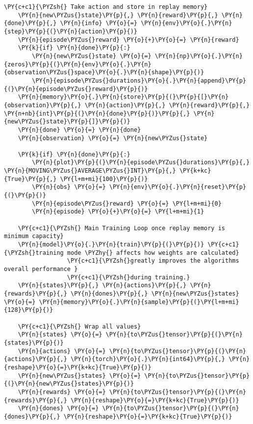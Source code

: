 \begin{tcolorbox}[breakable, size=fbox, boxrule=1pt, pad at break*=1mm,colback=cellbackground, colframe=cellborder]
\begin{Verbatim}[commandchars=\\\{\}]
    \PY{c+c1}{\PYZsh{} Take action and store in replay memory}
    \PY{n}{new\PYZus{}state}\PY{p}{,} \PY{n}{reward}\PY{p}{,} \PY{n}{done}\PY{p}{,} \PY{n}{info} \PY{o}{=} \PY{n}{env}\PY{o}{.}\PY{n}{step}\PY{p}{(}\PY{n}{action}\PY{p}{)}
    \PY{n}{episode\PYZus{}reward} \PY{o}{+}\PY{o}{=} \PY{n}{reward}
    \PY{k}{if} \PY{n}{done}\PY{p}{:}
        \PY{n}{new\PYZus{}state} \PY{o}{=} \PY{n}{np}\PY{o}{.}\PY{n}{zeros}\PY{p}{(}\PY{n}{env}\PY{o}{.}\PY{n}{observation\PYZus{}space}\PY{o}{.}\PY{n}{shape}\PY{p}{)}
        \PY{n}{episode\PYZus{}durations}\PY{o}{.}\PY{n}{append}\PY{p}{(}\PY{n}{episode\PYZus{}reward}\PY{p}{)}
    \PY{n}{memory}\PY{o}{.}\PY{n}{store}\PY{p}{(}\PY{p}{[}\PY{n}{observation}\PY{p}{,} \PY{n}{action}\PY{p}{,} \PY{n}{reward}\PY{p}{,} \PY{n+nb}{int}\PY{p}{(}\PY{n}{done}\PY{p}{)}\PY{p}{,} \PY{n}{new\PYZus{}state}\PY{p}{]}\PY{p}{)}
    \PY{n}{done} \PY{o}{=} \PY{n}{done}
    \PY{n}{observation} \PY{o}{=} \PY{n}{new\PYZus{}state}

    \PY{k}{if} \PY{n}{done}\PY{p}{:}
        \PY{n}{plot}\PY{p}{(}\PY{n}{episode\PYZus{}durations}\PY{p}{,} \PY{n}{MOVING\PYZus{}AVERAGE\PYZus{}INT}\PY{p}{,} \PY{k+kc}{True}\PY{p}{,} \PY{l+m+mi}{100}\PY{p}{)}
        \PY{n}{obs} \PY{o}{=} \PY{n}{env}\PY{o}{.}\PY{n}{reset}\PY{p}{(}\PY{p}{)}
        \PY{n}{episode\PYZus{}reward} \PY{o}{=} \PY{l+m+mi}{0}
        \PY{n}{episode} \PY{o}{+}\PY{o}{=} \PY{l+m+mi}{1}

    \PY{c+c1}{\PYZsh{} Main Training Loop once replay memory is minimum capacity}
    \PY{n}{model}\PY{o}{.}\PY{n}{train}\PY{p}{(}\PY{p}{)} \PY{c+c1}{\PYZsh{}training mode \PYZhy{} affects how weights are calculated}
                  \PY{c+c1}{\PYZsh{}greatly improves the algorithms overall performance }
                  \PY{c+c1}{\PYZsh{}during training.}
    \PY{n}{states}\PY{p}{,} \PY{n}{actions}\PY{p}{,} \PY{n}{rewards}\PY{p}{,} \PY{n}{dones}\PY{p}{,} \PY{n}{new\PYZus{}states} \PY{o}{=} \PY{n}{memory}\PY{o}{.}\PY{n}{sample}\PY{p}{(}\PY{l+m+mi}{128}\PY{p}{)}

    \PY{c+c1}{\PYZsh{} Wrap all values}
    \PY{n}{states} \PY{o}{=} \PY{n}{to\PYZus{}tensor}\PY{p}{(}\PY{n}{states}\PY{p}{)}
    \PY{n}{actions} \PY{o}{=} \PY{n}{to\PYZus{}tensor}\PY{p}{(}\PY{n}{actions}\PY{p}{,} \PY{n}{torch}\PY{o}{.}\PY{n}{int64}\PY{p}{,} \PY{n}{reshape}\PY{o}{=}\PY{k+kc}{True}\PY{p}{)}
    \PY{n}{new\PYZus{}states} \PY{o}{=} \PY{n}{to\PYZus{}tensor}\PY{p}{(}\PY{n}{new\PYZus{}states}\PY{p}{)}
    \PY{n}{rewards} \PY{o}{=} \PY{n}{to\PYZus{}tensor}\PY{p}{(}\PY{n}{rewards}\PY{p}{,} \PY{n}{reshape}\PY{o}{=}\PY{k+kc}{True}\PY{p}{)}
    \PY{n}{dones} \PY{o}{=} \PY{n}{to\PYZus{}tensor}\PY{p}{(}\PY{n}{dones}\PY{p}{,} \PY{n}{reshape}\PY{o}{=}\PY{k+kc}{True}\PY{p}{)}


\end{Verbatim}
\end{tcolorbox}
